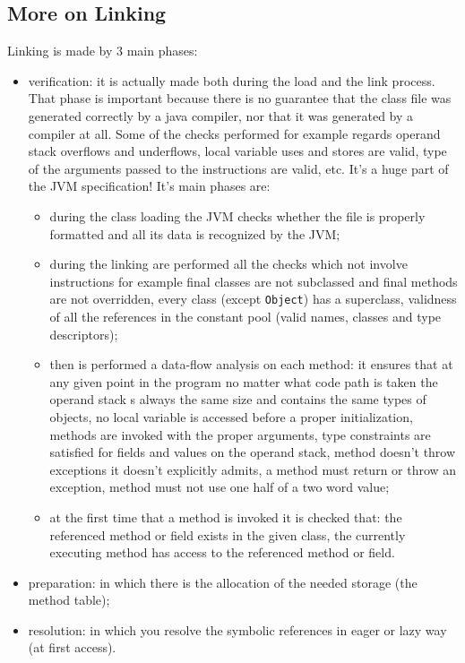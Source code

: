 \subsection{More on Linking}
Linking is made by 3 main phases:
\begin{itemize}
    \item verification: it is actually made both during the load and the link process.
    That phase is important because there is no guarantee that the class file was generated correctly by a java compiler, nor that it was generated by a compiler at all.
    Some of the checks performed for example regards operand stack overflows and underflows, local variable uses and stores are valid, type of the arguments passed to the instructions are valid, etc.
    It's a huge part of the JVM specification!
    It's main phases are:
    \begin{itemize}
        \item during the class loading the JVM checks whether the file is properly formatted and all its data is recognized by the JVM;
        
        \item during the linking are performed all the checks which not involve instructions for example final classes are not subclassed and final methods are not overridden, every class (except \verb|Object|) has a superclass, validness of all the references in the constant pool (valid names, classes and type descriptors);
        
        \item then is performed a data-flow analysis on each method: it ensures that at any given point in the program no matter what code path is taken the operand stack s always the same size and contains the same types of objects, no local variable is accessed before a proper initialization, methods are invoked with the proper arguments, type constraints are satisfied for fields and values on the operand stack, method doesn't throw exceptions it doesn't explicitly admits, a method must return or throw an exception, method must not use one half of a two word value;

        \item at the first time that a method is invoked it is checked that: the referenced method or field exists in the given class, the currently executing method has access to the referenced method or field.
    \end{itemize}
    
    \item preparation: in which there is the allocation of the needed storage (the method table);
    
    \item resolution: in which you resolve the symbolic references in eager or lazy way (at first access).
\end{itemize}

